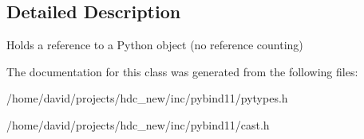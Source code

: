 \subsection{Detailed Description}
Holds a reference to a Python object (no reference counting) 

The documentation for this class was generated from the following files\+:\begin{DoxyCompactItemize}
\item 
/home/david/projects/hdc\+\_\+new/inc/pybind11/pytypes.\+h\item 
/home/david/projects/hdc\+\_\+new/inc/pybind11/cast.\+h\end{DoxyCompactItemize}
